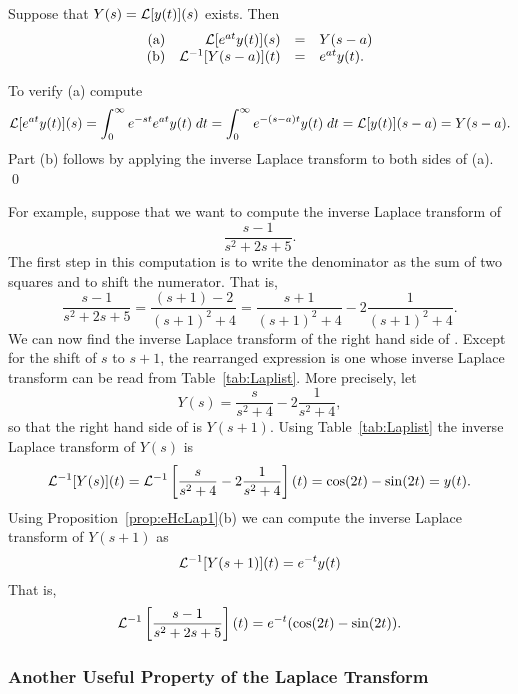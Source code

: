 \begin{prop}  \label{prop:eHcLap1}
Suppose that $Y(s)={\cal L}[y(t)](s)$ exists.  Then
\[
\begin{array}{rrcl}
\mbox{(a)} & {\cal L}[e^{at}y(t)](s) & = & Y(s-a)\\
\mbox{(b)} & {\cal L}^{-1}[Y(s-a)](t) & = & e^{at}y(t).
\end{array}
\]
\end{prop}

\proof  To verify (a) compute
\[
{\cal L}[e^{at}y(t)](s) = \int_0^{\infty} e^{-st}e^{at} y(t)\; dt
= \int_0^{\infty} e^{-(s-a)t} y(t)\; dt = {\cal L}[y(t)](s-a) = Y(s-a).
\]
Part (b) follows by applying the inverse Laplace transform to both sides 
of (a).  \qed

For example, suppose that we want to compute the inverse Laplace transform of 
\begin{equation}  \label{e:exlappf}
\frac{s-1}{s^2+2s+5}.
\end{equation}
The first step in this computation is to write the denominator as the sum of 
two squares and to shift the numerator.   That is,
\begin{equation}  \label{e:pf1}
\frac{s-1}{s^2+2s+5} = \frac{(s+1)-2}{(s+1)^2+4} = 
\frac{s+1}{(s+1)^2+4} - 2\frac{1}{(s+1)^2+4}.
\end{equation}
We can now find the inverse Laplace transform of the right hand side of 
.  Except for the shift of $s$ to $s+1$, the rearranged expression 
 is one whose inverse Laplace transform can be read from 
Table~\ref{tab:Laplist}.  More precisely, let 
\[
Y(s) = \frac{s}{s^2+4} - 2\frac{1}{s^2+4},
\]
so that the right hand side of  is $Y(s+1)$.  Using 
Table~\ref{tab:Laplist} the inverse Laplace transform of $Y(s)$ is
\begin{equation}  \label{e:exlappf2}
{\cal L}^{-1}[Y(s)](t) = 
{\cal L}^{-1}\left[\frac{s}{s^2+4} - 2\frac{1}{s^2+4}\right](t) = 
\cos(2t) - \sin(2t) = y(t).
\end{equation}
Using Proposition~\ref{prop:eHcLap1}(b) we can compute the inverse Laplace 
transform of $Y(s+1)$ 
as
\[
{\cal L}^{-1}[Y(s+1)](t) = e^{-t}y(t)
\]
That is,
\[
{\cal L}^{-1}\left[\frac{s-1}{s^2+2s+5}\right](t) = e^{-t}(\cos(2t)-\sin(2t)).
\]

\subsubsection*{Another Useful Property of the Laplace Transform}

